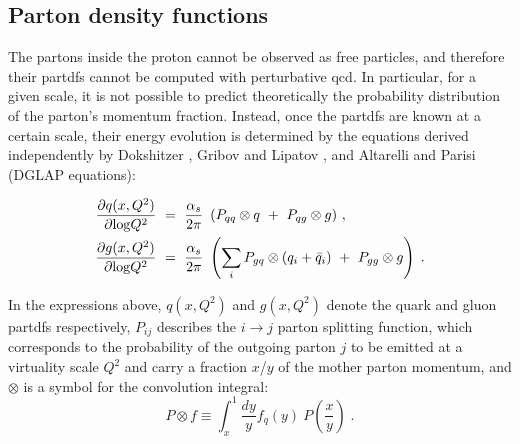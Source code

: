 


\subsection{Parton density functions}
\label{sec:protpdf}

The partons inside the proton cannot be observed as free particles, and therefore their \glspl{partdf} cannot be computed with
perturbative \gls{qcd}. In particular, for a given scale, it is not possible to predict theoretically the probability distribution 
of the parton's momentum fraction. Instead, once the \glspl{partdf} are known at a certain scale, their energy evolution is 
determined by the equations derived independently by Dokshitzer \cite{Dokshitzer:1977sg} , Gribov and Lipatov \cite{Gribov:1972ri}, and Altarelli and Parisi \cite{ALTARELLI1977298} (DGLAP equations):

\begin{equation}
\begin{aligned}
\frac{\partial q(x,Q^2)}{\partial {\rm log}Q^2}~&=~\frac{\alpha_s}{2\pi}~\left( P_{qq} \otimes q~+~P_{qg} \otimes g \right) \, ,\\
\frac{\partial g(x,Q^2)}{\partial {\rm log}Q^2}~&=~\frac{\alpha_s}{2\pi}~\left( \sum_i P_{gq} \otimes (q_i+\bar{q}_i)~+~P_{gg} \otimes g \right) \; . \nonumber
\label{eq:glap1}
\end{aligned}
\end{equation}

\noindent In the expressions above, $q(x,Q^2)$ and $g(x,Q^2)$ denote the quark and gluon \glspl{partdf} respectively, 
$P_{ij}$ describes the $i \to j$ parton splitting function, 
which corresponds to the probability of the outgoing parton $j$ 
to be emitted at a virtuality scale $Q^2$ and carry a fraction $x$/$y$ of the mother parton momentum, 
and $\otimes$ is a symbol for the convolution integral:
\begin{equation}
P \otimes f \equiv \int^1_x\frac{dy}{y}f_q(y)~P\left(\frac{x}{y}\right) \; . \nonumber
\end{equation}

